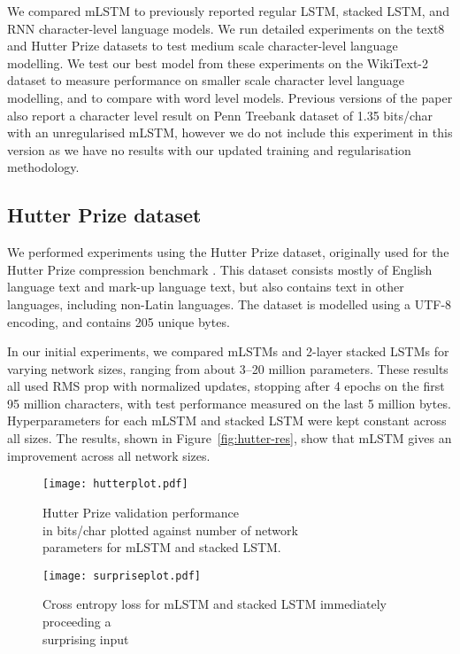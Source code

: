 \documentclass{article}
\begin{document}
We compared mLSTM to previously reported regular LSTM, stacked LSTM, and RNN character-level language models. We run detailed experiments on the text8 and Hutter Prize datasets \citep{Hutter2012} to test medium scale character-level language modelling. We test our best model from these experiments on the WikiText-2 dataset \citep{Merity2016} to measure performance on smaller scale character level language modelling, and to compare with word level models. Previous versions of the paper also report a character level result on Penn Treebank dataset \citep{marcus1993} of 1.35 bits/char with an unregularised mLSTM, however we do not include this experiment in this version as we have no results with our updated training and regularisation methodology.


\subsection{Hutter Prize dataset}
We performed experiments using the Hutter Prize dataset, originally used for the Hutter Prize compression benchmark \citep{Hutter2012}. This dataset consists mostly of English language text and mark-up language text, but also contains text in other languages, including non-Latin languages. The dataset is modelled using a UTF-8 encoding, and contains 205 unique bytes. 

In our initial experiments, we compared mLSTMs and 2-layer stacked LSTMs for varying network sizes, ranging from about 3--20 million parameters. These results all used RMS prop with normalized updates, stopping after 4 epochs on the first 95 million characters, with test performance measured on the last 5 million bytes. Hyperparameters for each mLSTM and stacked LSTM were kept constant across all sizes. The results, shown in Figure~\ref{fig:hutter-res}, show that mLSTM gives an improvement across all network sizes. 

\begin{figure}
  \begin{minipage}[b]{0.5\textwidth}
    \texttt{[image: hutterplot.pdf]}
    \caption{Hutter Prize validation performance \\ in bits/char plotted against number of network \\ parameters for mLSTM and stacked LSTM.}
    \label{fig:hutter-res}
  \end{minipage}
  \begin{minipage}[b]{0.5\textwidth}
    \texttt{[image: surpriseplot.pdf]}
    \caption{Cross entropy loss for mLSTM and stacked LSTM immediately proceeding a \\ surprising input}
    \label{fig:surprise-res}
  \end{minipage}
\end{figure}
\end{document}
